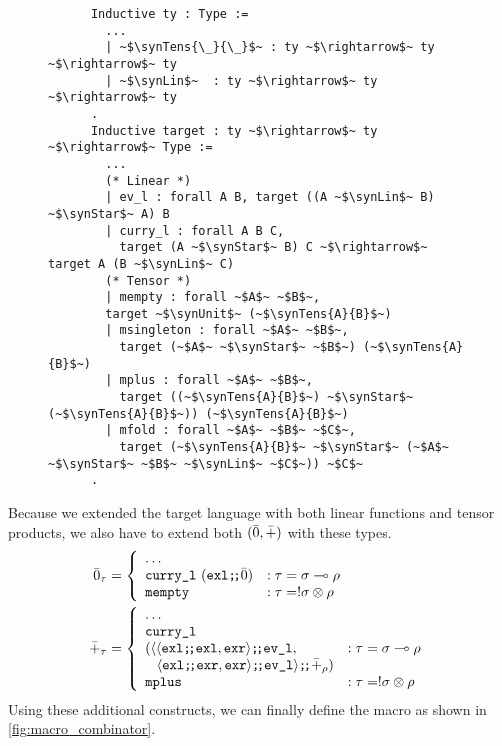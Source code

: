  \begin{figure}
    \centering
    \begin{verbatim}
      Inductive ty : Type :=
        ...
        | ~$\synTens{\_}{\_}$~ : ty ~$\rightarrow$~ ty ~$\rightarrow$~ ty
        | ~$\synLin$~  : ty ~$\rightarrow$~ ty ~$\rightarrow$~ ty
      .
      Inductive target : ty ~$\rightarrow$~ ty ~$\rightarrow$~ Type :=
        ...
        (* Linear *)
        | ev_l : forall A B, target ((A ~$\synLin$~ B) ~$\synStar$~ A) B
        | curry_l : forall A B C,
          target (A ~$\synStar$~ B) C ~$\rightarrow$~ target A (B ~$\synLin$~ C)
        (* Tensor *)
        | mempty : forall ~$A$~ ~$B$~,
        target ~$\synUnit$~ (~$\synTens{A}{B}$~)
        | msingleton : forall ~$A$~ ~$B$~,
          target (~$A$~ ~$\synStar$~ ~$B$~) (~$\synTens{A}{B}$~)
        | mplus : forall ~$A$~ ~$B$~,
          target ((~$\synTens{A}{B}$~) ~$\synStar$~ (~$\synTens{A}{B}$~)) (~$\synTens{A}{B}$~)
        | mfold : forall ~$A$~ ~$B$~ ~$C$~,
          target (~$\synTens{A}{B}$~ ~$\synStar$~ (~$A$~ ~$\synStar$~ ~$B$~ ~$\synLin$~ ~$C$~)) ~$C$~
      .
    \end{verbatim}
    \caption{}
    \label{fig:combinator_linear}
  \end{figure}

  Because we extended the target language with both linear functions and tensor products, we also have to extend both $(\bar{0}, \bar{+})$ with these types.
  \begin{align*}
    \bar{0}_\tau &=
      \left\{
        \begin{array}{ll}
          \dots \\
          \texttt{curry\_l}\ (\texttt{exl} \texttt{;\!;} \bar{0}) & : \tau = \sigma \multimap \rho \\
          \texttt{mempty} & : \tau = !\sigma\otimes\rho \\
        \end{array}
      \right. \\
    \bar{+}_\tau &=
      \left\{
        \begin{array}{ll}
          \dots \\
          \texttt{curry\_l}\  \\
            (\langle
              \langle \texttt{exl} \texttt{;\!;} \texttt{exl}, \texttt{exr} \rangle \texttt{;\!;} \texttt{ev\_l}, & : \tau = \sigma \multimap \rho \\
              \;\;\;\langle \texttt{exl} \texttt{;\!;} \texttt{exr}, \texttt{exr} \rangle \texttt{;\!;} \texttt{ev\_l} \rangle \texttt{;\!;} \bar{+}_\rho) \\
          \texttt{mplus} & : \tau = !\sigma\otimes\rho \\
        \end{array}
      \right.
  \end{align*}
  Using these additional constructs, we can finally define the macro as shown in \cref{fig:macro_combinator}.

